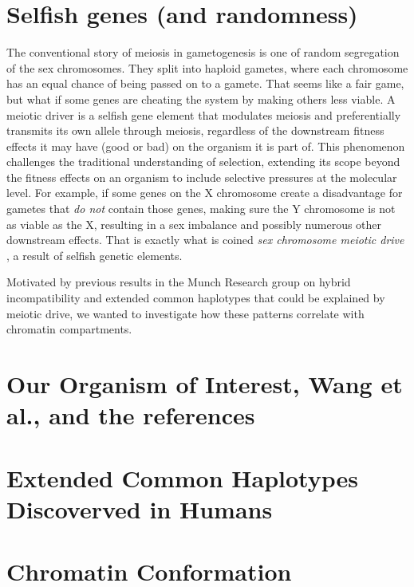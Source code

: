 \documentclass[
  11pt,
  a4paper,
]{scrbook}
\let\oldemph\emph
\renewcommand\emph[1]{\oldemph{\color{gray}#1}}
\begin{document}
\section{Selfish genes (and
randomness)}\label{selfish-genes-and-randomness}

The conventional story of meiosis in gametogenesis is one of random
segregation of the sex chromosomes. They split into haploid gametes,
where each chromosome has an equal chance of being passed on to a
gamete. That seems like a fair game, but what if some genes are cheating
the system by making others less viable. A meiotic driver is a selfish
gene element that modulates meiosis and preferentially transmits its own
allele through meiosis, regardless of the downstream fitness effects it
may have (good or bad) on the organism it is part of. This phenomenon
challenges the traditional understanding of selection, extending its
scope beyond the fitness effects on an organism to include selective
pressures at the molecular level. For example, if some genes on the X
chromosome create a disadvantage for gametes that \emph{do not} contain
those genes, making sure the Y chromosome is not as viable as the X,
resulting in a sex imbalance and possibly numerous other downstream
effects. That is exactly what is coined \emph{sex chromosome meiotic
drive} \citep{jaenike_sex_2001}, a result of selfish genetic elements.

Motivated by previous results in the Munch Research group
\citep{munch_group_2024} on hybrid incompatibility and extended common
haplotypes \citep{skov_extraordinary_2023, sorensen_genome_wide_2023}
that could be explained by meiotic drive, we wanted to investigate how
these patterns correlate with chromatin compartments.

\section{Our Organism of Interest, Wang et al., and the
references}\label{our-organism-of-interest-wang-et-al.-and-the-references}

\section{Extended Common Haplotypes Discoverved in
Humans}\label{extended-common-haplotypes-discoverved-in-humans}

\section{Chromatin Conformation}\label{chromatin-conformation}
\end{document}
